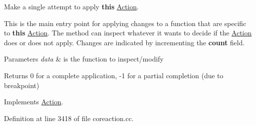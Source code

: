 Make a single attempt to apply {\bfseries{this}} \mbox{\hyperlink{class_action}{Action}}. 

This is the main entry point for applying changes to a function that are specific to {\bfseries{this}} \mbox{\hyperlink{class_action}{Action}}. The method can inspect whatever it wants to decide if the \mbox{\hyperlink{class_action}{Action}} does or does not apply. Changes are indicated by incrementing the {\bfseries{count}} field. 
\begin{DoxyParams}{Parameters}
{\em data} & is the function to inspect/modify \\
\hline
\end{DoxyParams}
\begin{DoxyReturn}{Returns}
0 for a complete application, -\/1 for a partial completion (due to breakpoint) 
\end{DoxyReturn}


Implements \mbox{\hyperlink{class_action_aac1c3999d6c685b15f5d9765a4d04173}{Action}}.



Definition at line 3418 of file coreaction.\+cc.

